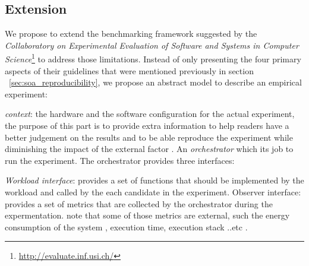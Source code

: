 
\subsection{Extension}\label{sec:bench_extension}
We propose to extend the benchmarking framework suggested by the \emph{Collaboratory on Experimental Evaluation of Software and Systems in Computer Science}\footnote{\url{http://evaluate.inf.usi.ch/}} to address those limitations.
Instead of only presenting the four primary aspects of their guidelines that were mentioned previously in section ~\ref{sec:soa_reproducibility}, we propose an abstract model to describe an empirical experiment:

\emph{context}: the hardware and the software configuration for the actual experiment, the purpose of this part is to provide extra information to help readers have a better judgement on the results and to be able reproduce the experiment while diminishing the impact of the external factor . 
An \emph{orchestrator} which its job to run the experiment. 
The orchestrator provides three interfaces: 

\emph{Workload interface}: provides a set of functions that should be implemented by the workload  and called by the each candidate in the experiment. 
Observer interface: provides a set of metrics that are collected by the orchestrator during the expermentation. note that some of those metrics are external, such the energy consumption of the system , execution time, execution stack ..etc . 


